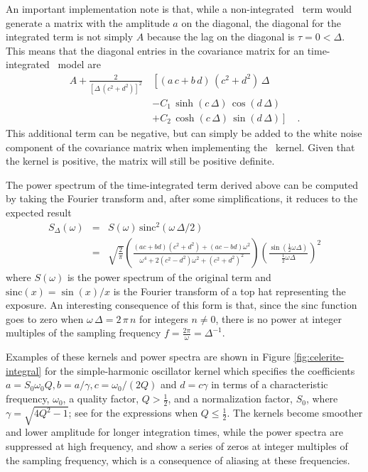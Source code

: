 \documentclass[modern]{aastex62}
\begin{document}
An important implementation note is that, while a non-integrated \celerite\ term would generate a matrix with the amplitude $a$ on the diagonal, the diagonal for the integrated term is not simply $A$ because the lag on the diagonal is $\tau = 0 < \Delta$.
This means that the diagonal entries in the covariance matrix for an time-integrated \celerite\ model are
\begin{align}
A + \frac{2}{[\Delta\,(c^2+d^2)]^2}\,&\left[
  (a\,c + b\,d)\,(c^2 + d^2)\,\Delta \right. \nonumber\\
  & - C_1\,\sinh(c\,\Delta)\,\cos(d\,\Delta) \nonumber\\
  & \left. + C_2\,\cosh(c\,\Delta)\,\sin(d\,\Delta)\right] \quad.
\end{align}
This additional term can be negative, but can simply be added to the white noise component of the covariance matrix when implementing the \celerite\ kernel.
Given that the kernel is positive, the matrix will still
be positive definite.

The power spectrum of the time-integrated term derived above can be computed by taking the Fourier transform and, after some simplifications, it reduces to the expected result
\begin{eqnarray}
S_\Delta(\omega) &=& S(\omega)\,\mathrm{sinc}^{2}(\omega\,\Delta/2)\nonumber\\
&=& \sqrt{\frac{2}{\pi}} \left(\frac{(ac+bd)(c^2+d^2)+(ac-bd)\omega^2}
  {\omega^4+2(c^2-d^2)\omega^2+(c^2+d^2)^2}\right)
  \left( \frac{\sin(\tfrac{1}{2}\omega \Delta)}{\tfrac{1}{2}\omega\Delta}\right)^2
\end{eqnarray}
where $S(\omega)$ is the power spectrum of the original term and $\mathrm{sinc}(x) = \sin(x)/x$ is the Fourier transform of a top hat representing the exposure.
An interesting consequence of this form is that, since the sinc function goes to zero when $\omega\,\Delta = 2\,\pi\,n$ for integers $n \ne 0$, there is no power at integer multiples of the sampling frequency $f = \frac{2\pi}{\omega} = \Delta^{-1}$.

Examples of these kernels and power spectra are shown in Figure \ref{fig:celerite-integral}
for the simple-harmonic oscillator kernel which specifies the coefficients
$a = S_0\omega_0 Q, b=a/\gamma, c=\omega_0/(2Q)$ and $d=c\gamma$ in terms of a characteristic
frequency, $\omega_0$, a quality factor, $Q > \tfrac{1}{2}$, and a normalization
factor, $S_0$, where $\gamma = \sqrt{4Q^2-1}$;  see \citet{Foreman-Mackey:2017} for the
expressions when $Q \le \tfrac{1}{2}$.
The kernels become smoother and lower amplitude for longer integration times,
while the power spectra are suppressed at high frequency, and show a series of
zeros at integer multiples of the sampling frequency, which is a consequence
of aliasing at these frequencies.
\end{document}
